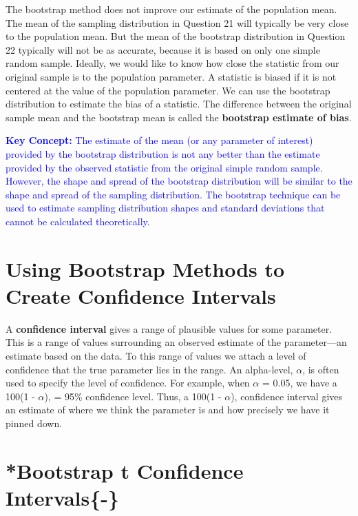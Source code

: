 \documentclass[
]{report}
\begin{document}
The bootstrap method does not improve our estimate of the population mean. The mean of the sampling distribution in Question 21 will typically be very close to the population mean. But the mean of the bootstrap distribution in Question 22 typically will not be as accurate, because it is based on only one simple random sample. Ideally, we would like to know how close the statistic from our original sample is to the population parameter. A statistic is biased if it is not centered at the value of the population parameter. We can use the bootstrap distribution to estimate the bias of a statistic. The difference between the original sample mean and the bootstrap mean is called the \textbf{bootstrap estimate of bias}.

\textbf{\textcolor{blue}{Key Concept:}}
\textcolor{blue}{The estimate of the mean (or any parameter of interest) provided by the bootstrap distribution is not any better than the estimate provided by the observed statistic from the original simple random sample. However, the shape and spread of the bootstrap distribution will be similar to the shape and spread of the sampling distribution. The bootstrap technique can be used to estimate sampling distribution shapes and standard deviations that cannot be calculated theoretically.}

\hypertarget{using-bootstrap-methods-to-create-confidence-intervals}{%
\section{\texorpdfstring{\textbf{Using Bootstrap Methods to Create Confidence Intervals}}{Using Bootstrap Methods to Create Confidence Intervals}}\label{using-bootstrap-methods-to-create-confidence-intervals}}

A \textbf{confidence interval} gives a range of plausible values for some parameter. This is a range of values surrounding an observed estimate of the parameter---an estimate based on the data. To this range of values we attach a level of confidence that the true parameter lies in the range. An alpha-level, \(\alpha\), is often used to specify the level of confidence. For example, when \(\alpha\) = 0.05, we have a 100(1 - \(\alpha\)), = 95\(\%\) confidence level. Thus, a 100(1 - \(\alpha\)), confidence interval gives an estimate of where we think the parameter is and how precisely we have it pinned down.

\hypertarget{bootstrap-t-confidence-intervals-}{%
\section{\texorpdfstring{*\textbf{Bootstrap t Confidence Intervals}\{-\}}{*Bootstrap t Confidence Intervals\{-\}}}\label{bootstrap-t-confidence-intervals-}}
\end{document}
